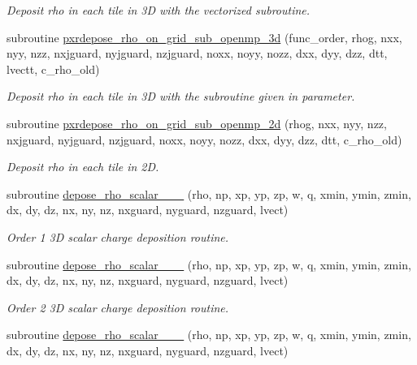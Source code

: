 \begin{DoxyCompactItemize}
\begin{DoxyCompactList}\small\item\em Deposit rho in each tile in 3D with the vectorized subroutine. \end{DoxyCompactList}\item 
subroutine \hyperlink{charge__deposition_8_f90_a4c7bbec5acca3a4743e65c308d59bdcf}{pxrdepose\+\_\+rho\+\_\+on\+\_\+grid\+\_\+sub\+\_\+openmp\+\_\+3d} (func\+\_\+order, rhog, nxx, nyy, nzz, nxjguard, nyjguard, nzjguard, noxx, noyy, nozz, dxx, dyy, dzz, dtt, lvectt, c\+\_\+rho\+\_\+old)
\begin{DoxyCompactList}\small\item\em Deposit rho in each tile in 3D with the subroutine given in parameter. \end{DoxyCompactList}\item 
subroutine \hyperlink{charge__deposition_8_f90_ab4d6c7838c470fda0e5bbc3ea68b0917}{pxrdepose\+\_\+rho\+\_\+on\+\_\+grid\+\_\+sub\+\_\+openmp\+\_\+2d} (rhog, nxx, nyy, nzz, nxjguard, nyjguard, nzjguard, noxx, noyy, nozz, dxx, dyy, dzz, dtt, c\+\_\+rho\+\_\+old)
\begin{DoxyCompactList}\small\item\em Deposit rho in each tile in 2D. \end{DoxyCompactList}\item 
subroutine \hyperlink{charge__deposition_8_f90_a448f1cab6e843064b45674d43a320022}{depose\+\_\+rho\+\_\+scalar\+\_\+\_\+\_} (rho, np, xp, yp, zp, w, q, xmin, ymin, zmin, dx, dy, dz, nx, ny, nz,                               nxguard, nyguard, nzguard, lvect)
\begin{DoxyCompactList}\small\item\em Order 1 3D scalar charge deposition routine. \end{DoxyCompactList}\item 
subroutine \hyperlink{charge__deposition_8_f90_a38e265fb630353694edfd86592922c74}{depose\+\_\+rho\+\_\+scalar\+\_\+\_\+\_} (rho, np, xp, yp, zp, w, q, xmin, ymin, zmin, dx, dy, dz, nx, ny, nz,                                   nxguard, nyguard, nzguard, lvect)
\begin{DoxyCompactList}\small\item\em Order 2 3D scalar charge deposition routine. \end{DoxyCompactList}\item 
subroutine \hyperlink{charge__deposition_8_f90_a7bc83de646747d60d464cd7bff59db9f}{depose\+\_\+rho\+\_\+scalar\+\_\+\_\+\_} (rho, np, xp, yp, zp, w, q, xmin, ymin, zmin, dx, dy, dz, nx, ny, nz,                                       nxguard, nyguard, nzguard, lvect)

\end{DoxyCompactItemize}
